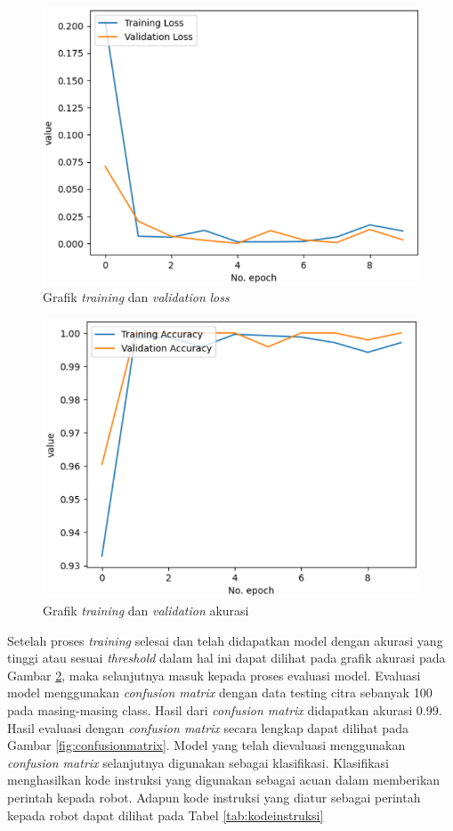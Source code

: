 \begin{figure}[H]
  \centering
  \includegraphics[width=0.7\linewidth]{../Gambar/loss.png}
  \caption{Grafik \emph{training} dan \emph{validation} \emph{loss}}
  \label{fig:loss}
\end{figure}

\begin{figure}[H]
  \centering
  \includegraphics[width=0.7\linewidth]{../Gambar/akurasi.png}
  \caption{Grafik \emph{training} dan \emph{validation} akurasi}
  \label{fig:akurasi}
\end{figure}

Setelah proses \emph{training} selesai dan telah didapatkan model dengan akurasi yang tinggi atau sesuai \emph{threshold} dalam hal ini dapat dilihat pada grafik akurasi pada Gambar \ref{fig:akurasi}, maka selanjutnya masuk kepada proses evaluasi model. Evaluasi model menggunakan \emph{confusion matrix} dengan data testing citra sebanyak 100 pada masing-masing class. Hasil dari \emph{confusion matrix} didapatkan akurasi 0.99. Hasil evaluasi dengan \emph{confusion matrix} secara lengkap dapat dilihat pada Gambar \ref{fig:confusionmatrix}. Model yang telah dievaluasi menggunakan \emph{confusion matrix} selanjutnya digunakan sebagai klasifikasi. Klasifikasi menghasilkan kode instruksi yang digunakan sebagai acuan dalam memberikan perintah kepada robot. Adapun kode instruksi yang diatur sebagai perintah kepada robot dapat dilihat pada Tabel \ref{tab:kodeinstruksi}

